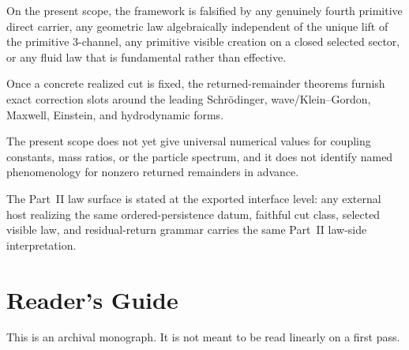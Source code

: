 \documentclass[11pt]{article}
\theoremstyle{definition}
\theoremstyle{remark}
\theoremstyle{definition}
\begin{document}
\begin{tcolorbox}[colback=white, colframe=black!70, title={Falsifiability, Empirical Stakes, and Portability}]
\footnotesize
\begin{description}[leftmargin=1.9em, itemsep=0.3em]
\item[Structural falsifiers.] On the present scope, the framework is falsified
      by any genuinely fourth primitive direct carrier, any geometric law
      algebraically independent of the unique lift of the primitive
      \(3\)-channel, any primitive visible creation on a closed selected
      sector, or any fluid law that is fundamental rather than effective.
\item[Model-dependent predictions.] Once a concrete realized cut is fixed, the
      returned-remainder theorems furnish exact correction slots around the
      leading Schr\"odinger, wave/Klein--Gordon, Maxwell, Einstein, and
      hydrodynamic forms.
\item[Not yet claimed.] The present scope does not yet give universal
      numerical values for coupling constants, mass ratios, or the particle
      spectrum, and it does not identify named phenomenology for nonzero
      returned remainders in advance.
\item[Portability.] The Part~II law surface is stated at the exported
      interface level: any external host realizing the same ordered-persistence
      datum, faithful cut class, selected visible law, and residual-return
      grammar carries the same Part~II law-side interpretation.
\end{description}
\end{tcolorbox}

\section*{Reader's Guide}
This is an archival monograph. It is not meant to be read linearly on a first
pass.
\end{document}
